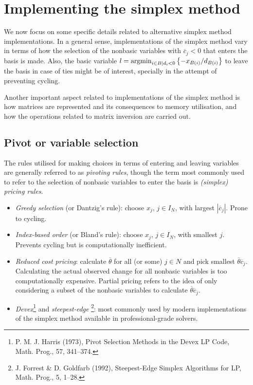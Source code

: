 \section{Implementing the simplex method}

We now focus on some specific details related to alternative simplex method implementations. In a general sense, implementations of the simplex method vary in terms of how the selection of the nonbasic variables with $\overline{c}_j < 0$ that enters the basis is made. Also, the basic variable $l = \mathop{\rm argmin}_{i \in B \mid d_i <0}\left\{ -x_{B(i)}/d_{B(i)} \right \}$ to leave the basis in case of ties might be of interest, specially in the attempt of preventing cycling.

Another important aspect related to implementations of the simplex method is how matrices are represented and its consequences to memory utilisation, and how the operations related to matrix inversion are carried out. 


\subsection{Pivot or variable selection}

The rules utilised for making choices in terms of entering and leaving variables are generally referred to as \emph{pivoting rules}, though the term most commonly used to refer to the selection of nonbasic variables to enter the basis is \emph{(simplex) pricing rules}.

\begin{itemize}
	\item \emph{Greedy selection} (or Dantzig's rule): choose $x_j$, $j \in I_N$, with largest $|\overline{c}_j|$. Prone to cycling.
	\item \emph{Index-based order} (or Bland's rule): choose $x_j$,  $j \in I_N$, with smallest $j$. Prevents cycling but is computationally inefficient. 
	\item \emph{Reduced cost pricing}: calculate $\overline{\theta}$ for all (or some) $j \in N$ and pick smallest $\overline{\theta}\overline{c}_j$. Calculating the actual observed change for all nonbasic variables is too computationally expensive. Partial pricing refers to the idea of only considering a subset of the nonbasic variables to calculate $\overline{\theta}\overline{c}_j$.
	\item \emph{Devex}\footnote{P. M. J. Harris (1973), Pivot Selection Methods in the Devex LP Code, Math. Prog., 57, 341--374.} and \emph{steepest-edge} \footnote{J. Forrest \& D. Goldfarb (1992), Steepest-Edge Simplex Algorithms for LP, Math. Prog., 5, 1--28.}: most commonly used by modern implementations of the simplex method available in professional-grade solvers. 
\end{itemize}


